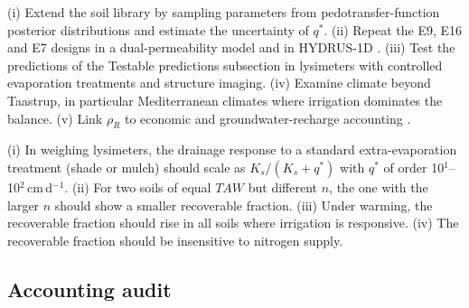 \documentclass[preprint,12pt,authoryear]{elsarticle}
\newcommand{\TAW}{\mathit{TAW}}
\begin{document}
(i) Extend the soil library by sampling parameters from pedotransfer-function posterior distributions and estimate the uncertainty of $q^\ast$. (ii) Repeat the E9, E16 and E7 designs in a dual-permeability model and in HYDRUS-1D \citep{Simunek2008}. (iii) Test the predictions of the Testable predictions subsection in lysimeters with controlled evaporation treatments and structure imaging. (iv) Examine climate beyond Taastrup, in particular Mediterranean climates where irrigation dominates the balance. (v) Link $\rho_R$ to economic and groundwater-recharge accounting \citep{Ward2008,Grafton2018}.

(i) In weighing lysimeters, the drainage response to a standard extra-evaporation treatment (shade or mulch) should scale as $K_s/(K_s+q^\ast)$ with $q^\ast$ of order 10$^1$--10$^2$\,cm\,d$^{-1}$. (ii) For two soils of equal $\TAW$ but different $n$, the one with the larger $n$ should show a smaller recoverable fraction. (iii) Under warming, the recoverable fraction should rise in all soils where irrigation is responsive. (iv) The recoverable fraction should be insensitive to nitrogen supply.

\subsection{Accounting audit}
\label{sec:discB}
\end{document}
